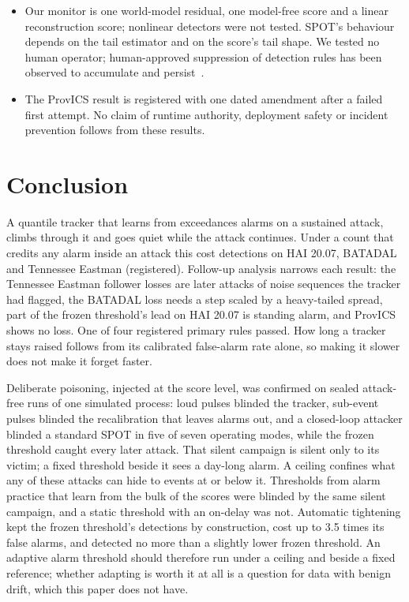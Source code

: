 \documentclass[sigconf]{acmart}
\begin{document}
\begin{itemize}
  Tennessee Eastman and of the HAI development releases are unchanged (HAI 20.07, BATADAL and ProvICS
  were not rechecked), and the ProvICS validity mask (Section~\ref{sec:provics}). The other two, in
  the first smoothing window and in the hold-off tracker's episode counter, were not rechecked.
\item Our monitor is one world-model residual, one model-free score and a linear reconstruction score;
  nonlinear detectors were not tested. SPOT's behaviour depends on the tail estimator and on the
  score's tail shape. We tested no human operator; human-approved suppression of detection rules has
  been observed to accumulate and persist~\cite{dhananjeyan2026ratchet}.
\item The ProvICS result is registered with one dated amendment after a failed first attempt. No claim
  of runtime authority, deployment safety or incident prevention follows from these results.
\end{itemize}

\FloatBarrier
\section{Conclusion}

A quantile tracker that learns from exceedances alarms on a sustained attack, climbs through it and
goes quiet while the attack continues. Under a count that credits any alarm inside an attack this cost
detections on HAI 20.07, BATADAL and Tennessee Eastman (registered). Follow-up analysis narrows each
result: the Tennessee Eastman follower losses are later attacks of noise sequences the tracker had flagged, the
BATADAL loss needs a step scaled by a heavy-tailed spread, part of the frozen threshold's lead on HAI
20.07 is standing alarm, and ProvICS shows no loss. One of four registered primary rules passed. How
long a tracker stays raised follows from its calibrated false-alarm rate alone, so making it slower
does not make it forget faster.

Deliberate poisoning, injected at the score level, was confirmed on sealed attack-free runs of one
simulated process: loud pulses blinded the tracker, sub-event pulses blinded the recalibration that
leaves alarms out, and a closed-loop attacker blinded a standard SPOT in five of seven operating modes,
while the frozen threshold caught every later attack. That silent campaign is silent only to its
victim; a fixed threshold beside it sees a day-long alarm. A ceiling confines what any of these attacks
can hide to events at or below it. Thresholds from alarm practice that learn from the bulk of the
scores were blinded by the same silent campaign, and a static threshold with an on-delay was not.
Automatic tightening kept the frozen threshold's detections by
construction, cost up to 3.5 times its false alarms, and detected no more than a slightly lower frozen
threshold. An adaptive alarm threshold should therefore run under a ceiling and beside a fixed
reference; whether adapting is worth it at all is a question for data with benign drift, which this
paper does not have.
\end{document}
